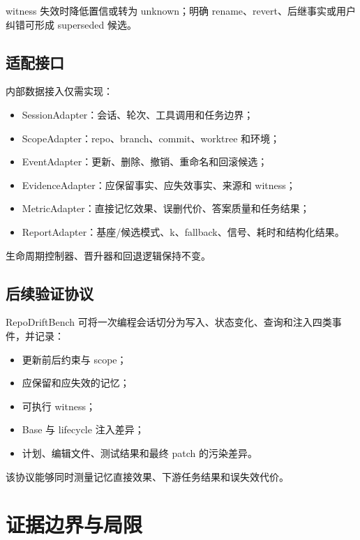 witness 失效时降低置信或转为 unknown；明确 rename、revert、后继事实或用户纠错可形成 superseded 候选。

\subsection{适配接口}

内部数据接入仅需实现：

\begin{itemize}
\item SessionAdapter：会话、轮次、工具调用和任务边界；
\item ScopeAdapter：repo、branch、commit、worktree 和环境；
\item EventAdapter：更新、删除、撤销、重命名和回滚候选；
\item EvidenceAdapter：应保留事实、应失效事实、来源和 witness；
\item MetricAdapter：直接记忆效果、误删代价、答案质量和任务结果；
\item ReportAdapter：基座/候选模式、k、fallback、信号、耗时和结构化结果。
\end{itemize}

生命周期控制器、晋升器和回退逻辑保持不变。

\subsection{后续验证协议}

RepoDriftBench 可将一次编程会话切分为写入、状态变化、查询和注入四类事件，并记录：

\begin{itemize}
\item 更新前后约束与 scope；
\item 应保留和应失效的记忆；
\item 可执行 witness；
\item Base 与 lifecycle 注入差异；
\item 计划、编辑文件、测试结果和最终 patch 的污染差异。
\end{itemize}

该协议能够同时测量记忆直接效果、下游任务结果和误失效代价。

\section{证据边界与局限}

